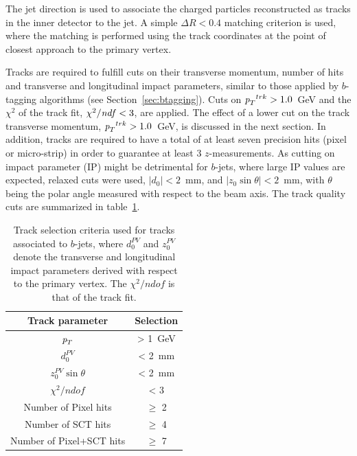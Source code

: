 The jet direction is used to associate the charged particles reconstructed as tracks in the inner detector to the jet.   A simple $\Delta R < 0.4$ matching criterion is used, where the matching is performed using the track coordinates at the point of closest approach to the primary vertex.

Tracks are required to fulfill cuts on their transverse momentum, number of hits and transverse and longitudinal impact parameters, similar to those applied by $b$-tagging algorithms (see Section~\ref{sec:btagging}).  Cuts on ${\emph{p}_{T}}^{trk}>1.0$~GeV and the $\chi^2$ of the track fit, $\chi^2/{\it ndf}<3$, are applied. The effect of a lower cut on the track transverse momentum, ${\emph{p}_{T}}^{trk}>1.0$~GeV, is discussed in the next section.  In addition, tracks are required to have a total of at least seven precision hits (pixel or micro-strip) in order to guarantee at least 3 $z$-measurements.  As cutting on impact parameter (IP) might be detrimental for $b$-jets, where large IP values are expected, relaxed cuts were used, $|d_{0}|<2$~mm, and $|z_{0}\sin\theta|<2$~mm, with $\theta$ being the polar angle measured with respect to the beam axis. The track quality cuts are summarized in table~\ref{tb:tracks}. %


\begin{table}[!hbt] %
\renewcommand{\arraystretch}{1.2}
\centering
\begin{tabular}{ c  c  }
  \hline
  Track parameter &  Selection \\ \hline
  ${\emph{p}_{T}}$   &   > 1~GeV \\
  $d_0^{PV}$   &   < 2~mm \\
  $z_0^{PV}\sin \theta$   &   < 2~mm \\
  $\chi^2 /ndof$   &   < 3 \\
  Number of Pixel hits   &  $\geq$ 2 \\
  Number of SCT hits   &   $\geq$ 4 \\
  Number of Pixel+SCT hits   &  $\geq$ 7 \\ \hline
\end{tabular}
\caption{Track selection criteria used for tracks associated to $b$-jets, where $d_0^{PV}$ and $z_0^{PV}$ denote the transverse and longitudinal impact parameters derived with respect to the primary vertex. The $\chi^2 / ndof$ is that of the track fit.}
\label{tb:tracks}
\end{table}




